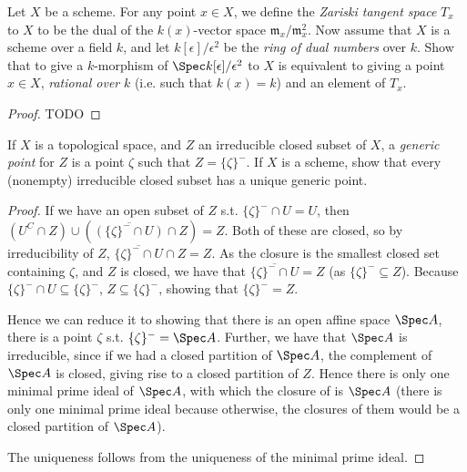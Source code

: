 \begin{exercise}%
	Let $X$	be a scheme. For any point $x\in X $, we define the \textit{Zariski tangent space} $T_x $ to $X $ to be the dual of the $k(x) $-vector space $\mathfrak{m}_x / \mathfrak{m}_x^2 $. Now assume that $X $ is a scheme over a field $k $, and let $k[\epsilon] / \epsilon^2$ be the \textit{ring of dual numbers} over $k $. Show that to give a $k $-morphism of $\Spec k[\epsilon] / \epsilon^2 $ to $X $ is equivalent to giving a point $x\in X $, \textit{rational over} $k $ (i.e. such that $k(x) = k $) and an element of $T_x $.
\end{exercise}
\begin{proof}
	TODO
\end{proof}

\begin{exercise}%
	If $X $ is a topological space, and $Z $ an irreducible closed subset of $X $, a \textit{generic point} for $Z $ is a point $\zeta $ such that $Z = \{\zeta\} ^-  $. If $X $ is a scheme, show that every (nonempty) irreducible closed subset has a unique generic point.
\end{exercise}
\begin{proof}
	If we have an open subset of $Z $ s.t. $\{\zeta\} ^-\cap U = U  $, then $(U^C\cap Z) \cup (\overline{(\{\zeta\} ^- \cap U)} \cap Z)= Z$.
	Both of these are closed, so by irreducibility of $Z $, $\overline{\{\zeta\} ^- \cap U }\cap Z = Z $.
	As the closure is the smallest closed set containing $\zeta $, and $Z $ is closed, we have that $\overline{\{\zeta\} ^- \cap U } = Z  $ (as $\{\zeta\} ^- \subseteq Z  $).
	Because $\{\zeta\} ^- \cap U \subseteq \{\zeta\} ^-   $, $Z \subseteq \{\zeta\} ^-  $, showing that $\{\zeta\} ^- = Z  $.

	Hence we can reduce it to showing that there is an open affine space $\Spec A $, there is a point $\zeta $ s.t. $\{\zeta\} ^- = \Spec A  $.
	Further, we have that $\Spec A $ is irreducible, since if we had a closed partition of $\Spec A $, the complement of $\Spec A $ is closed, giving rise to a closed partition of $Z $.
	Hence there is only one minimal prime ideal of $\Spec A $, with which the closure of is $\Spec A $ (there is only one minimal prime ideal because otherwise, the closures of them would be a closed partition of $\Spec A $).

	The uniqueness follows from the uniqueness of the minimal prime ideal.
\end{proof}

